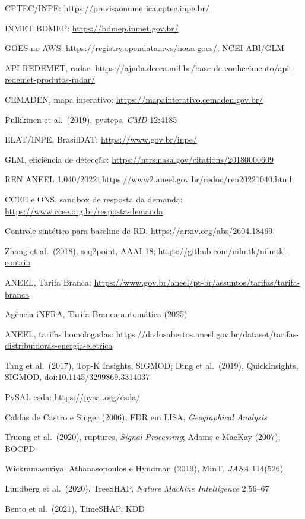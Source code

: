 {\begin{enumerate}[label={[\arabic*]},leftmargin=2.2em,itemsep=1pt]
\item CPTEC/INPE: \url{https://previsaonumerica.cptec.inpe.br/}
\item INMET BDMEP: \url{https://bdmep.inmet.gov.br/}
\item GOES no AWS: \url{https://registry.opendata.aws/noaa-goes/}; NCEI ABI/GLM
\item API REDEMET, radar: \url{https://ajuda.decea.mil.br/base-de-conhecimento/api-redemet-produtos-radar/}
\item CEMADEN, mapa interativo: \url{https://mapainterativo.cemaden.gov.br/}
\item Pulkkinen et al.\ (2019), pysteps, \emph{GMD} 12:4185
\item ELAT/INPE, BrasilDAT: \url{https://www.gov.br/inpe/}
\item GLM, eficiência de detecção: \url{https://ntrs.nasa.gov/citations/20180000609}
\item REN ANEEL 1.040/2022: \url{https://www2.aneel.gov.br/cedoc/ren20221040.html}
\item CCEE e ONS, sandbox de resposta da demanda: \url{https://www.ccee.org.br/resposta-demanda}
\item Controle sintético para baseline de RD: \url{https://arxiv.org/abs/2604.18469}
\item Zhang et al.\ (2018), seq2point, AAAI-18; \url{https://github.com/nilmtk/nilmtk-contrib}
\item ANEEL, Tarifa Branca: \url{https://www.gov.br/aneel/pt-br/assuntos/tarifas/tarifa-branca}
\item Agência iNFRA, Tarifa Branca automática (2025)
\item ANEEL, tarifas homologadas: \url{https://dadosabertos.aneel.gov.br/dataset/tarifas-distribuidoras-energia-eletrica}
\item Tang et al.\ (2017), Top-K Insights, SIGMOD; Ding et al.\ (2019), QuickInsights, SIGMOD, doi:10.1145/3299869.3314037
\item PySAL esda: \url{https://pysal.org/esda/}
\item Caldas de Castro e Singer (2006), FDR em LISA, \emph{Geographical Analysis}
\item Truong et al.\ (2020), ruptures, \emph{Signal Processing}; Adams e MacKay (2007), BOCPD
\item Wickramasuriya, Athanasopoulos e Hyndman (2019), MinT, \emph{JASA} 114(526)
\item Lundberg et al.\ (2020), TreeSHAP, \emph{Nature Machine Intelligence} 2:56--67
\item Bento et al.\ (2021), TimeSHAP, KDD

\end{enumerate}}
